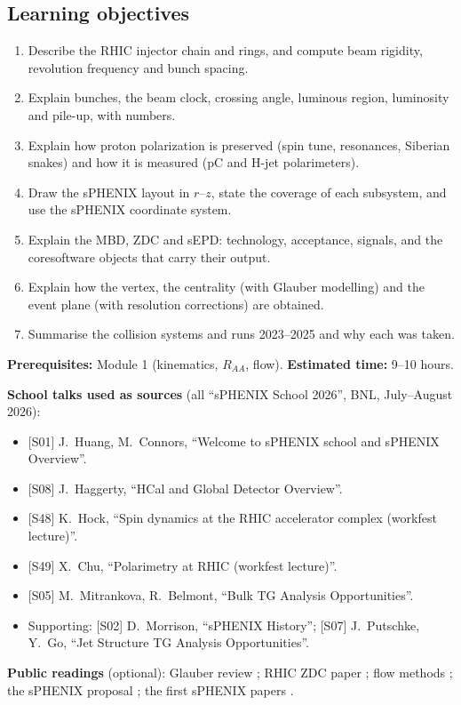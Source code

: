 \documentclass[11pt,letterpaper]{article}
\newcommand{\RAA}{R_{AA}}
\begin{document}
\subsection*{Learning objectives}
\begin{enumerate}[label=O\arabic*.]
\item Describe the RHIC injector chain and rings, and compute beam rigidity, revolution frequency and bunch spacing.
\item Explain bunches, the beam clock, crossing angle, luminous region, luminosity and pile-up, with numbers.
\item Explain how proton polarization is preserved (spin tune, resonances, Siberian snakes) and how it is measured (pC and H-jet polarimeters).
\item Draw the sPHENIX layout in $r$--$z$, state the coverage of each subsystem, and use the sPHENIX coordinate system.
\item Explain the MBD, ZDC and sEPD: technology, acceptance, signals, and the coresoftware objects that carry their output.
\item Explain how the vertex, the centrality (with Glauber modelling) and the event plane (with resolution corrections) are obtained.
\item Summarise the collision systems and runs 2023--2025 and why each was taken.
\end{enumerate}
\textbf{Prerequisites:} Module 1 (kinematics, $\RAA$, flow). \textbf{Estimated time:} 9--10 hours.

\noindent\textbf{School talks used as sources} (all ``sPHENIX School 2026'', BNL, July--August 2026):
\begin{itemize}
\item {[S01]} J.\ Huang, M.\ Connors, ``Welcome to sPHENIX school and sPHENIX Overview''.
\item {[S08]} J.\ Haggerty, ``HCal and Global Detector Overview''.
\item {[S48]} K.\ Hock, ``Spin dynamics at the RHIC accelerator complex (workfest lecture)''.
\item {[S49]} X.\ Chu, ``Polarimetry at RHIC (workfest lecture)''.
\item {[S05]} M.\ Mitrankova, R.\ Belmont, ``Bulk TG Analysis Opportunities''.
\item Supporting: {[S02]} D.\ Morrison, ``sPHENIX History''; {[S07]} J.\ Putschke, Y.\ Go, ``Jet Structure TG Analysis Opportunities''.
\end{itemize}
\textbf{Public readings} (optional): Glauber review \cite{glauber}; RHIC ZDC paper \cite{zdc}; flow methods \cite{pv};
the sPHENIX proposal \cite{proposal}; the first sPHENIX papers \cite{bulk1,bulk2,dijet,isogamma}.
\end{document}
